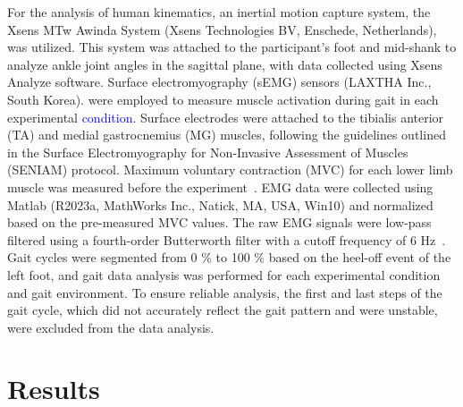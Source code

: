 \documentclass[journal,article,submit,pdftex,moreauthors]{Definitions/mdpi}
\begin{document}
For the analysis of human kinematics, an inertial motion capture system, the Xsens MTw Awinda System (Xsens Technologies BV, Enschede, Netherlands), was utilized. This system was attached to the participant's foot and mid-shank to analyze ankle joint angles in the sagittal plane, with data collected using Xsens Analyze software.
Surface electromyography (sEMG) sensors (LAXTHA Inc., South Korea). were employed to measure muscle activation during gait in each experimental \textcolor{blue}{condition}. Surface electrodes were attached to the tibialis anterior (TA) and medial gastrocnemius (MG) muscles, following the guidelines outlined in the Surface Electromyography for Non-Invasive Assessment of Muscles (SENIAM) protocol. Maximum voluntary contraction (MVC) for each lower limb muscle was measured before the experiment~\cite{Allison1993,Burden2010}. EMG data were collected using Matlab (R2023a, MathWorks Inc., Natick, MA, USA, Win10) and normalized based on the pre-measured MVC values. The raw EMG signals were low-pass filtered using a fourth-order Butterworth filter with a cutoff frequency of 6 Hz~\cite{Roger2007}.
Gait cycles were segmented from 0 \% to 100 \% based on the heel-off event of the left foot, and gait data analysis was performed for each experimental condition and gait environment. To ensure reliable analysis, the first and last steps of the gait cycle, which did not accurately reflect the gait pattern and were unstable, were excluded from the data analysis.

\section{Results}
\end{document}

